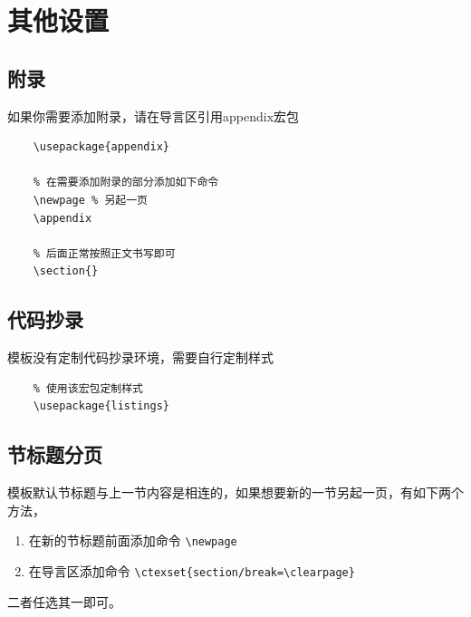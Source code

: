 \newpage
\appendix

\section{其他设置}
\subsection{附录}
如果你需要添加附录，请在导言区引用{\ttfamily appendix}宏包
\begin{lstlisting}
    \usepackage{appendix}

    % 在需要添加附录的部分添加如下命令
    \newpage % 另起一页
    \appendix 

    % 后面正常按照正文书写即可
    \section{}
\end{lstlisting}

\subsection{代码抄录}
模板没有定制代码抄录环境，需要自行定制样式
\begin{lstlisting}
    % 使用该宏包定制样式
    \usepackage{listings}
\end{lstlisting}

\subsection {节标题分页}
模板默认节标题与上一节内容是相连的，如果想要新的一节另起一页，有如下两个
方法，
\begin{enumerate}
    \item 在新的节标题前面添加命令 \lstinline|\newpage|
    \item 在导言区添加命令 \lstinline|\ctexset{section/break=\clearpage}|
\end{enumerate}
二者任选其一即可。
